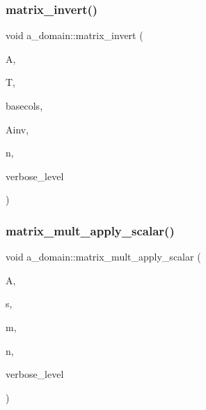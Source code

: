 \mbox{\label{classa__domain_af55f171ad67c2b35e762f1ba51aaa4c4}} 
\subsubsection{\texorpdfstring{matrix\+\_\+invert()}{matrix\_invert()}}
{\footnotesize\ttfamily void a\+\_\+domain\+::matrix\+\_\+invert (\begin{DoxyParamCaption}\item[{\mbox{\hyperlink{galois_8h_a09fddde158a3a20bd2dcadb609de11dc}{I\+NT}} $\ast$}]{A,  }\item[{\mbox{\hyperlink{galois_8h_a09fddde158a3a20bd2dcadb609de11dc}{I\+NT}} $\ast$}]{T,  }\item[{\mbox{\hyperlink{galois_8h_a09fddde158a3a20bd2dcadb609de11dc}{I\+NT}} $\ast$}]{basecols,  }\item[{\mbox{\hyperlink{galois_8h_a09fddde158a3a20bd2dcadb609de11dc}{I\+NT}} $\ast$}]{Ainv,  }\item[{\mbox{\hyperlink{galois_8h_a09fddde158a3a20bd2dcadb609de11dc}{I\+NT}}}]{n,  }\item[{\mbox{\hyperlink{galois_8h_a09fddde158a3a20bd2dcadb609de11dc}{I\+NT}}}]{verbose\+\_\+level }\end{DoxyParamCaption})}

\mbox{\label{classa__domain_a6094dfdeafec684a5bd0c3247e83c49e}} 
\subsubsection{\texorpdfstring{matrix\+\_\+mult\+\_\+apply\+\_\+scalar()}{matrix\_mult\_apply\_scalar()}}
{\footnotesize\ttfamily void a\+\_\+domain\+::matrix\+\_\+mult\+\_\+apply\+\_\+scalar (\begin{DoxyParamCaption}\item[{\mbox{\hyperlink{galois_8h_a09fddde158a3a20bd2dcadb609de11dc}{I\+NT}} $\ast$}]{A,  }\item[{\mbox{\hyperlink{galois_8h_a09fddde158a3a20bd2dcadb609de11dc}{I\+NT}} $\ast$}]{s,  }\item[{\mbox{\hyperlink{galois_8h_a09fddde158a3a20bd2dcadb609de11dc}{I\+NT}}}]{m,  }\item[{\mbox{\hyperlink{galois_8h_a09fddde158a3a20bd2dcadb609de11dc}{I\+NT}}}]{n,  }\item[{\mbox{\hyperlink{galois_8h_a09fddde158a3a20bd2dcadb609de11dc}{I\+NT}}}]{verbose\+\_\+level }\end{DoxyParamCaption})}

